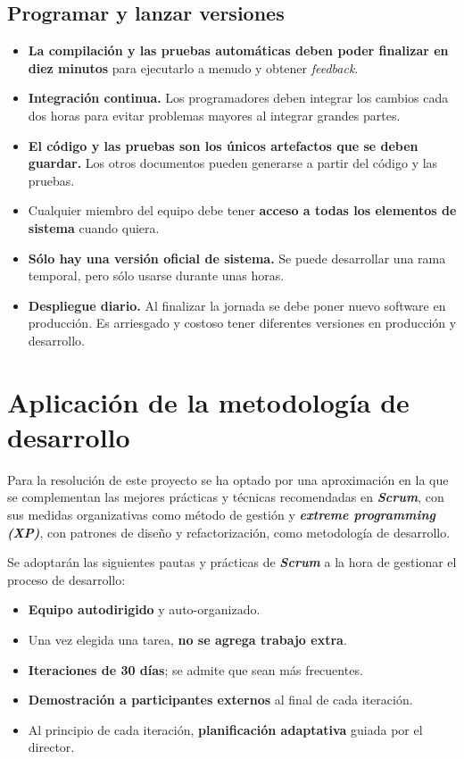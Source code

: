 \subsection{Programar y lanzar versiones}
\begin{itemize}
\item \textbf{La compilación y las pruebas automáticas deben poder finalizar en diez minutos} para ejecutarlo a menudo y obtener \textit{feedback}. 
\item \textbf{Integración continua.} Los programadores deben integrar los cambios cada dos horas para evitar problemas mayores al integrar grandes partes.
\item \textbf{El código y las pruebas son los únicos artefactos que se deben guardar.} Los otros documentos pueden generarse a partir del código y las pruebas.
\item Cualquier miembro del equipo debe tener \textbf{acceso a todas los elementos de sistema} cuando quiera. 
\item \textbf{Sólo hay una versión oficial de sistema.} Se puede desarrollar una rama temporal, pero sólo usarse durante unas horas.
\item \textbf{Despliegue diario.} Al finalizar la jornada se debe poner nuevo software en producción. Es arriesgado y costoso tener diferentes versiones en producción y desarrollo.
\end{itemize}

\section{Aplicación de la metodología de desarrollo}

Para la resolución de este proyecto se ha optado por una aproximación en la que se complementan las mejores prácticas y técnicas recomendadas en \textbf{\textit{Scrum}}, con sus medidas organizativas como método de gestión y \textbf{\textit{extreme programming (XP)}}, con patrones de diseño y refactorización, como metodología de desarrollo.

Se adoptarán las siguientes pautas y prácticas de \textbf{\textit{Scrum}} a la hora de gestionar el proceso de desarrollo:
\begin{itemize}
\item \textbf{Equipo autodirigido} y auto-organizado. 
\item Una vez elegida una tarea, \textbf{no se agrega trabajo extra}. %
\item \textbf{Iteraciones de 30 días}; se admite que sean más frecuentes.
\item \textbf{Demostración a participantes externos} al final de cada iteración. 
\item Al principio de cada iteración, \textbf{planificación adaptativa} guiada por el director.
\end{itemize}

